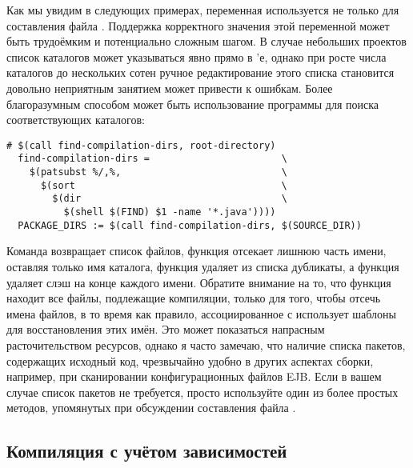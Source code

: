 Как мы увидим в следующих примерах, переменная
 используется не только для составления файла
. Поддержка корректного значения этой переменной
может быть трудоёмким и потенциально сложным шагом. В случае небольших
проектов список каталогов может указываться явно прямо в
\Makefile{}'е, однако при росте числа каталогов до нескольких сотен
ручное редактирование этого списка становится довольно неприятным
занятием может привести к ошибкам. Более благоразумным способом может
быть использование программы  для поиска соответствующих
каталогов:

{\footnotesize
\begin{verbatim}
# $(call find-compilation-dirs, root-directory)
  find-compilation-dirs =                       \
    $(patsubst %/,%,                            \
      $(sort                                    \
        $(dir                                   \
          $(shell $(FIND) $1 -name '*.java'))))
  PACKAGE_DIRS := $(call find-compilation-dirs, $(SOURCE_DIR))

\end{verbatim}
}

Команда  возвращает список файлов, функция
 отсекает лишнюю часть имени, оставляя только имя
каталога, функция  удаляет из списка дубликаты, а
функция \function{patsubst} удаляет слэш на конце каждого имени.
Обратите внимание на то, что функция 
находит все файлы, подлежащие компиляции, только для того, чтобы
отсечь имена файлов, в то время как правило, ассоциированное с
\filename{all.javas} использует шаблоны для восстановления этих имён.
Это может показаться напрасным расточительством ресурсов, однако я
часто замечаю, что наличие списка пакетов, содержащих исходный код,
чрезвычайно удобно в других аспектах сборки, например, при
сканировании конфигурационных файлов EJB. Если в вашем случае список
пакетов не требуется, просто используйте один из более простых
методов, упомянутых при обсуждении составления файла
\filename{all.javas}.

\subsection*{Компиляция с учётом зависимостей}

